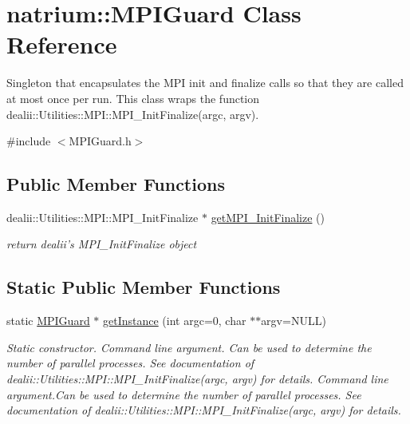 \hypertarget{classnatrium_1_1MPIGuard}{\section{natrium\-:\-:M\-P\-I\-Guard Class Reference}
\label{classnatrium_1_1MPIGuard}
}


Singleton that encapsulates the M\-P\-I init and finalize calls so that they are called at most once per run. This class wraps the function dealii\-::\-Utilities\-::\-M\-P\-I\-::\-M\-P\-I\-\_\-\-Init\-Finalize(argc, argv).  




{\ttfamily \#include $<$M\-P\-I\-Guard.\-h$>$}

\subsection*{Public Member Functions}
\begin{DoxyCompactItemize}
\item 
\hypertarget{classnatrium_1_1MPIGuard_a3211b8cb3a966a3f776eb669ae3ef0fe}{dealii\-::\-Utilities\-::\-M\-P\-I\-::\-M\-P\-I\-\_\-\-Init\-Finalize $\ast$ \hyperlink{classnatrium_1_1MPIGuard_a3211b8cb3a966a3f776eb669ae3ef0fe}{get\-M\-P\-I\-\_\-\-Init\-Finalize} ()}\label{classnatrium_1_1MPIGuard_a3211b8cb3a966a3f776eb669ae3ef0fe}

\begin{DoxyCompactList}\small\item\em return dealii's M\-P\-I\-\_\-\-Init\-Finalize object \end{DoxyCompactList}\end{DoxyCompactItemize}
\subsection*{Static Public Member Functions}
\begin{DoxyCompactItemize}
\item 
\hypertarget{classnatrium_1_1MPIGuard_a665a19e7f489daba1f311b65fc5931a8}{static \hyperlink{classnatrium_1_1MPIGuard}{M\-P\-I\-Guard} $\ast$ \hyperlink{classnatrium_1_1MPIGuard_a665a19e7f489daba1f311b65fc5931a8}{get\-Instance} (int argc=0, char $\ast$$\ast$argv=N\-U\-L\-L)}\label{classnatrium_1_1MPIGuard_a665a19e7f489daba1f311b65fc5931a8}

\begin{DoxyCompactList}\small\item\em Static constructor.  Command line argument. Can be used to determine the number of parallel processes. See documentation of dealii\-::\-Utilities\-::\-M\-P\-I\-::\-M\-P\-I\-\_\-\-Init\-Finalize(argc, argv) for details.  Command line argument.\-Can be used to determine the number of parallel processes. See documentation of dealii\-::\-Utilities\-::\-M\-P\-I\-::\-M\-P\-I\-\_\-\-Init\-Finalize(argc, argv) for details. \end{DoxyCompactList}\end{DoxyCompactItemize}
